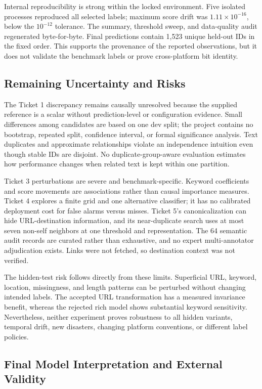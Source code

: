 \documentclass[conference]{IEEEtran}
\begin{document}
Internal reproducibility is strong within the locked environment. Five isolated processes reproduced all selected labels; maximum score drift was $1.11\times10^{-16}$, below the $10^{-12}$ tolerance. The summary, threshold sweep, and data-quality audit regenerated byte-for-byte. Final predictions contain 1,523 unique held-out IDs in the fixed order. This supports the provenance of the reported observations, but it does not validate the benchmark labels or prove cross-platform bit identity.

\subsection{Remaining Uncertainty and Risks}

The Ticket 1 discrepancy remains causally unresolved because the supplied reference is a scalar without prediction-level or configuration evidence. Small differences among candidates are based on one dev split; the project contains no bootstrap, repeated split, confidence interval, or formal significance analysis. Text duplicates and approximate relationships violate an independence intuition even though stable IDs are disjoint. No duplicate-group-aware evaluation estimates how performance changes when related text is kept within one partition.

Ticket 3 perturbations are severe and benchmark-specific. Keyword coefficients and score movements are associations rather than causal importance measures. Ticket 4 explores a finite grid and one alternative classifier; it has no calibrated deployment cost for false alarms versus misses. Ticket 5's canonicalization can hide URL-destination information, and its near-duplicate search uses at most seven non-self neighbors at one threshold and representation. The 64 semantic audit records are curated rather than exhaustive, and no expert multi-annotator adjudication exists. Links were not fetched, so destination context was not verified.

The hidden-test risk follows directly from these limits. Superficial URL, keyword, location, missingness, and length patterns can be perturbed without changing intended labels. The accepted URL transformation has a measured invariance benefit, whereas the rejected rich model shows substantial keyword sensitivity. Nevertheless, neither experiment proves robustness to all hidden variants, temporal drift, new disasters, changing platform conventions, or different label policies.

\subsection{Final Model Interpretation and External Validity}
\end{document}

